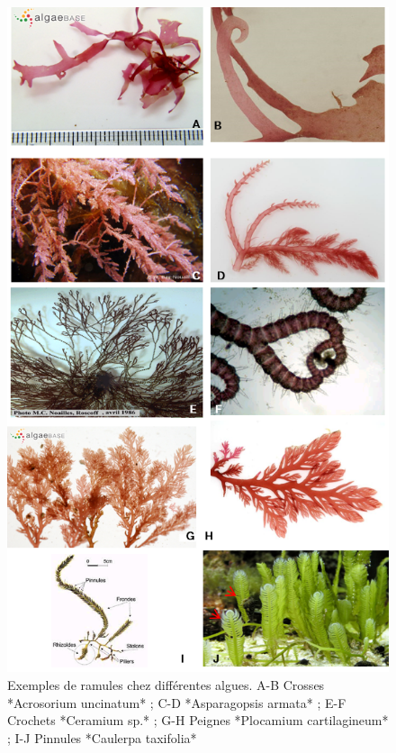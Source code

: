 \documentclass[
]{book}
\begin{document}
\begin{figure}[H]

{\centering \includegraphics[width=0.7\linewidth]{./images/ramules} 

}

\caption{Exemples de ramules chez différentes algues. A-B Crosses *Acrosorium uncinatum* ; C-D *Asparagopsis armata* ; E-F Crochets *Ceramium sp.* ; G-H Peignes *Plocamium cartilagineum* ; I-J Pinnules *Caulerpa taxifolia*}\label{fig:ramule}
\end{figure}

  
\end{document}
